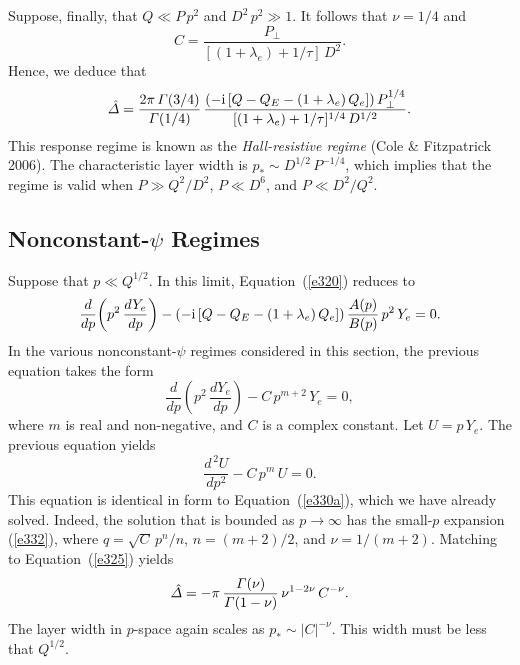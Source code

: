 \documentclass[notitlepage,12pt]{article}
\begin{document}
Suppose, finally, that $Q\ll P\,p^2$ and $D^2\,p^2\gg 1$. It follows that $\nu=1/4$ and
\begin{equation}
C = \frac{P_\perp}{[(1+\lambda_e)+1/\tau]\,D^2}.
\end{equation}
Hence, we deduce that 
\begin{equation}\label{hr}
\hat{\mit\Delta}= \frac{2\pi\,{\mit\Gamma}(3/4)}{{\mit\Gamma}(1/4)}\,\frac{(-{\rm i}\,[Q-Q_E-(1+\lambda_e)\,Q_e])\,P_\perp^{1/4}}{[(1+\lambda_e)+1/\tau]^{1/4}\,D^{1/2}}.
\end{equation}
This response regime is known as the {\em Hall-resistive regime}\/ (Cole \& Fitzpatrick 2006). The characteristic
layer width is $p_\ast \sim D^{1/2}\,P^{-1/4}$, which implies that the regime is valid when $P\gg Q^2/D^2$,
$P\ll D^6$, and $P\ll D^2/Q^2$. 

\subsection{Nonconstant-$\psi$ Regimes}\label{sncp}
Suppose that $p\ll Q^{1/2}$. In this limit, Equation~(\ref{e320}) reduces to 
\begin{equation}
\frac{d}{dp}\!\left(p^2\,\frac{dY_e}{dp}\right)-(-{\rm i}\,[Q-Q_E-(1+\lambda_e)\,Q_e])\,\frac{A(p)}{B(p)}\,p^2\,Y_e=0.
\end{equation}
In the various nonconstant-$\psi$ regimes considered in this section, the previous equation takes the form
\begin{equation}
\frac{d}{dp}\!\left(p^2\,\frac{dY_e}{dp}\right)-C\,p^{m+2}\,Y_e = 0,
\end{equation}
where $m$ is real and non-negative, and $C$ is a complex constant. Let $U=p\,Y_e$. The previous equation
yields
\begin{equation}
\frac{d^{\,2} U}{dp^2} - C\,p^m\,U = 0.
\end{equation}
This equation is identical in form to Equation~(\ref{e330a}), which we have already solved. Indeed, the solution that
is bounded as $p\rightarrow\infty$ has the small-$p$ expansion (\ref{e332}), where $q=\sqrt{C}\,p^n/n$, 
$n=(m+2)/2$, and $\nu=1/(m+2)$. Matching to Equation~(\ref{e325}) yields
\begin{equation}
\hat{\mit\Delta} = -\pi\,\frac{{\mit\Gamma}(\nu)}{{\mit\Gamma}(1-\nu)}\,\nu^{1-2\nu}\,C^{-\nu}.
\end{equation}
The layer width in $p$-space again scales as $p_\ast\sim |C|^{-\nu}$. This width must be
less that $Q^{1/2}$. 
\end{document}
